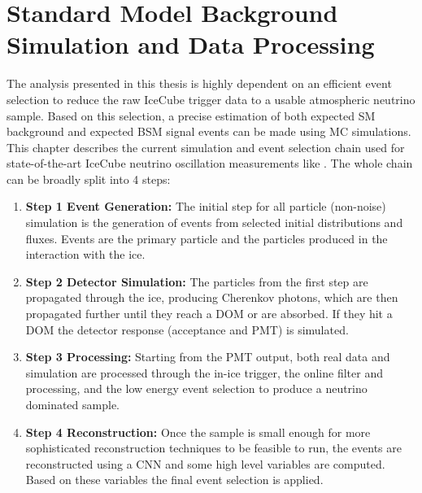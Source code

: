 \setchapterpreamble[u]{\margintoc}


\chapter{Standard Model Background Simulation and Data Processing}



The analysis presented in this thesis is highly dependent on an efficient event selection to reduce the raw IceCube trigger data to a usable atmospheric neutrino sample. Based on this selection, a precise estimation of both expected SM background and expected BSM signal events can be made using MC simulations. This chapter describes the current simulation and event selection chain used for state-of-the-art IceCube neutrino oscillation measurements like . The whole chain can be broadly split into 4 steps:

\begin{enumerate}[wide]
    
    \item[]{\textbf{Step 1 Event Generation:}} The initial step for all particle (non-noise) simulation is the generation of events from selected initial distributions and fluxes. Events are the primary particle and the particles produced in the interaction with the ice.
    \vspace{0.2cm} 

    \item[]{\textbf{Step 2 Detector Simulation:}} The particles from the first step are propagated through the ice, producing Cherenkov photons, which are then propagated further until they reach a DOM or are absorbed. If they hit a DOM the detector response (acceptance and PMT) is simulated.
    \vspace{0.2cm} 
        
    \item[]{\textbf{Step 3 Processing:}} Starting from the PMT output, both real data and simulation are processed through the in-ice trigger, the online filter and processing, and the low energy event selection to produce a neutrino dominated sample.
    \vspace{0.2cm} 

    \item[]{\textbf{Step 4 Reconstruction:}} Once the sample is small enough for more sophisticated reconstruction techniques to be feasible to run, the events are reconstructed using a CNN and some high level variables are computed. Based on these variables the final event selection is applied.
    
\end{enumerate}

